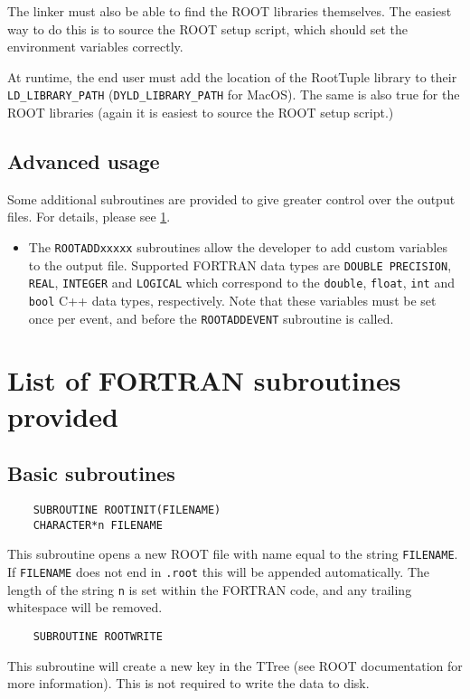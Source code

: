\documentclass[a4paper,12pt]{article}
\begin{document}
The linker must also be able to find the ROOT libraries themselves. The easiest way to do this is to source the ROOT setup script, which should set the environment variables correctly.

At runtime, the end user must add the location of the RootTuple library to their \verb|LD_LIBRARY_PATH| (\verb|DYLD_LIBRARY_PATH| for MacOS). The same is also true for the ROOT libraries (again it is easiest to source the ROOT setup script.)

\subsection{Advanced usage}
Some additional subroutines are provided to give greater control over the output files. For details, please see \textsection\ref{sec:routines}.
\begin{itemize}
    \item The \verb|ROOTADDxxxxx| subroutines allow the developer to add custom variables to the output file. Supported FORTRAN data types are \verb|DOUBLE PRECISION|, \verb|REAL|, \verb|INTEGER| and \verb|LOGICAL| which correspond to the \verb|double|, \verb|float|, \verb|int| and \verb|bool| C++ data types, respectively. Note that these variables must be set once per event, and before the \verb|ROOTADDEVENT| subroutine is called.
\end{itemize}

\section{List of FORTRAN subroutines provided}
\label{sec:routines}
\subsection{Basic subroutines}
\begin{verbatim}
    SUBROUTINE ROOTINIT(FILENAME)
    CHARACTER*n FILENAME\end{verbatim}
This subroutine opens a new ROOT file with name equal to the string \verb|FILENAME|. If \verb|FILENAME| does not end in \verb|.root| this will be appended automatically. The length of the string \verb|n| is set within the FORTRAN code, and any trailing whitespace will be removed.

\begin{verbatim}
    SUBROUTINE ROOTWRITE\end{verbatim}
This subroutine will create a new key in the TTree (see ROOT documentation for more information). This is not required to write the data to disk.
\end{document}

